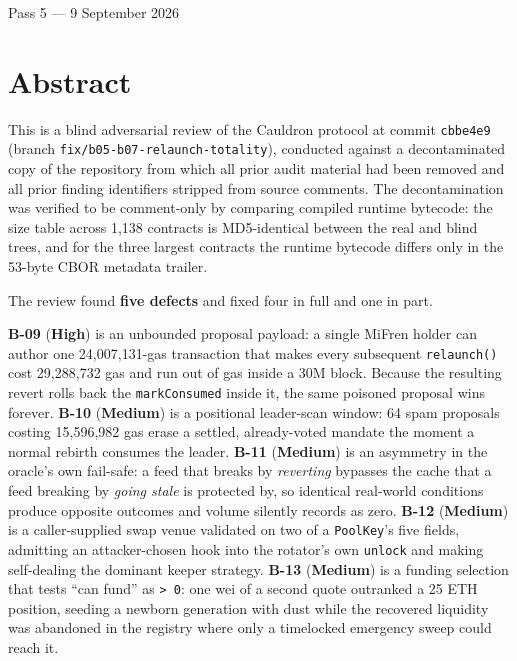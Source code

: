 \documentclass[11pt,a4paper]{article}
\newcommand{\SevHigh}{\textcolor{high}{\textbf{High}}}
\newcommand{\SevMed}{\textcolor{medium}{\textbf{Medium}}}
\newcommand{\code}[1]{\texttt{\small #1}}
\begin{document}
\begin{titlepage}
\vfill
{\small\color{slate}Pass 5 --- 9 September 2026\par}
\end{titlepage}

\tableofcontents
\newpage

\section{Abstract}

This is a blind adversarial review of the Cauldron protocol at commit \code{cbbe4e9}
(branch \code{fix/b05-b07-relaunch-totality}), conducted against a decontaminated copy of
the repository from which all prior audit material had been removed and all prior finding
identifiers stripped from source comments. The decontamination was verified to be
comment-only by comparing compiled runtime bytecode: the size table across 1{,}138
contracts is MD5-identical between the real and blind trees, and for the three largest
contracts the runtime bytecode differs only in the 53-byte CBOR metadata trailer.

The review found \textbf{five defects} and fixed four in full and one in part.

\textbf{B-09} (\SevHigh) is an unbounded proposal payload: a single MiFren holder can
author one 24{,}007{,}131-gas transaction that makes every subsequent \code{relaunch()}
cost 29{,}288{,}732 gas and run out of gas inside a 30M block. Because the resulting
revert rolls back the \code{markConsumed} inside it, the same poisoned proposal wins
forever. \textbf{B-10} (\SevMed) is a positional leader-scan window: 64 spam proposals
costing 15{,}596{,}982 gas erase a settled, already-voted mandate the moment a normal
rebirth consumes the leader. \textbf{B-11} (\SevMed) is an asymmetry in the oracle's own
fail-safe: a feed that breaks by \emph{reverting} bypasses the cache that a feed breaking
by \emph{going stale} is protected by, so identical real-world conditions produce
opposite outcomes and volume silently records as zero. \textbf{B-12} (\SevMed) is a
caller-supplied swap venue validated on two of a \code{PoolKey}'s five fields, admitting
an attacker-chosen hook into the rotator's own \code{unlock} and making self-dealing the
dominant keeper strategy. \textbf{B-13} (\SevMed) is a funding selection that tests
``can fund'' as \code{> 0}: one wei of a second quote outranked a 25 ETH position, seeding
a newborn generation with dust while the recovered liquidity was abandoned in the registry
where only a timelocked emergency sweep could reach it.
\end{document}
